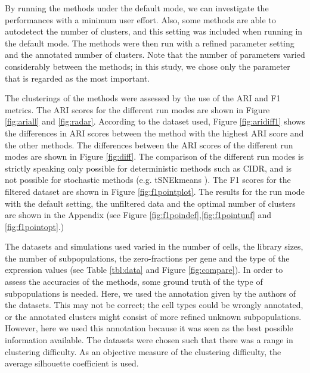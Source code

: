 \documentclass[12pt, a4paper]{article}\usepackage[]{graphicx}\usepackage[]{color}
\begin{document}
By running the methods under the default mode, we can investigate the performances with a minimum user effort. Also, some methods are able to autodetect the number of clusters, and this setting was included when running in the default mode. The methods were then run with a refined parameter setting and the annotated number of clusters. Note that the number of parameters varied considerably between the methods; in this study, we chose only the parameter that is regarded as the most important.

The clusterings of the methods were assessed by the use of the ARI and F1 metrics. The ARI scores for the different run modes are shown in Figure \ref{fig:ariall} and \ref{fig:radar}. According to the dataset used, Figure \ref{fig:aridiff1} shows the differences in ARI scores between the method with the highest ARI score and the other methods. The differences between the ARI scores of the different run modes are shown in Figure \ref{fig:diff}. The comparison of the different run modes is strictly speaking only possible for deterministic methods such as CIDR, and is not possible for stochastic methods (e.g. tSNEkmeans ). The F1 scores for the filtered dataset are shown in Figure \ref{fig:f1pointplot}. The results for the run mode with the default setting, the unfiltered data and the optimal number of clusters are shown in the Appendix (see Figure \ref{fig:f1poindef},\ref{fig:f1pointunf} and \ref{fig:f1pointopt}.)

The datasets and simulations used varied in the number of cells, the library sizes, the number of subpopulations, the zero-fractions per gene and the type of the expression values (see Table \ref{tbl:data} and Figure \ref{fig:compare}). In order to assess the accuracies of the methods, some ground truth of the type of subpopulations is needed. Here, we used the annotation given by the authors of the datasets. This may not be correct; the cell types could be wrongly annotated, or the annotated clusters might consist of more refined unknown subpopulations. However, here we used this annotation because it was seen as the best possible information available. The datasets were chosen such that there was a range in clustering difficulty. As an objective measure of the clustering difficulty, the average silhouette coefficient is used. 
\end{document}
